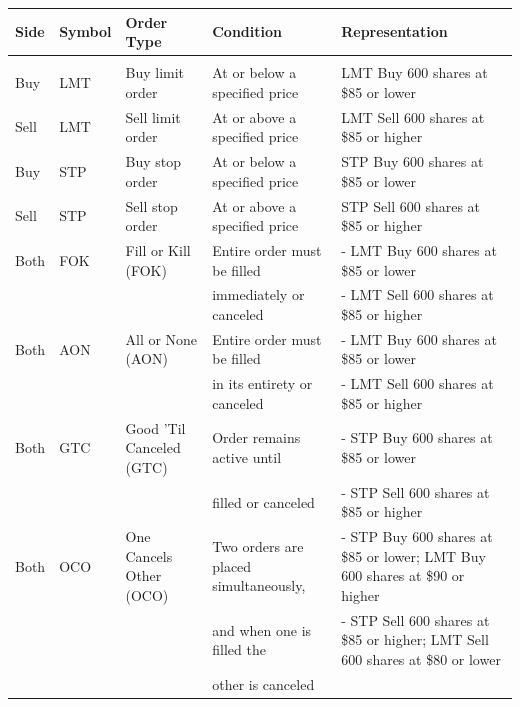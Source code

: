 \documentclass[11pt]{article}
\begin{document}
\begin{center}
\begin{tabular}{lllll}
\hline
Side & Symbol & Order Type & Condition & Representation\\[0pt]
\hline
 &  &  &  & \\[0pt]
Buy & LMT & Buy limit order & At or below a specified price & LMT Buy 600 shares at \$85 or lower\\[0pt]
\hline
Sell & LMT & Sell limit order & At or above a specified price & LMT Sell 600 shares at \$85 or higher\\[0pt]
\hline
Buy & STP & Buy stop order & At or below a specified price & STP Buy 600 shares at \$85 or lower\\[0pt]
\hline
Sell & STP & Sell stop order & At or above a specified price & STP Sell 600 shares at \$85 or higher\\[0pt]
\hline
Both & FOK & Fill or Kill (FOK) & Entire order must be filled & - LMT Buy 600 shares at \$85 or lower\\[0pt]
 &  &  & immediately or canceled & - LMT Sell 600 shares at \$85 or higher\\[0pt]
\hline
Both & AON & All or None (AON) & Entire order must be filled & - LMT Buy 600 shares at \$85 or lower\\[0pt]
 &  &  & in its entirety or canceled & - LMT Sell 600 shares at \$85 or higher\\[0pt]
\hline
Both & GTC & Good 'Til Canceled (GTC) & Order remains active until & - STP Buy 600 shares at \$85 or lower\\[0pt]
 &  &  & filled or canceled & - STP Sell 600 shares at \$85 or higher\\[0pt]
\hline
Both & OCO & One Cancels Other (OCO) & Two orders are placed simultaneously, & - STP Buy 600 shares at \$85 or lower; LMT Buy 600 shares at \$90 or higher\\[0pt]
 &  &  & and when one is filled the & - STP Sell 600 shares at \$85 or higher; LMT Sell 600 shares at \$80 or lower\\[0pt]
 &  &  & other is canceled & \\[0pt]
\hline
\end{tabular}
\end{center}
\end{document}
